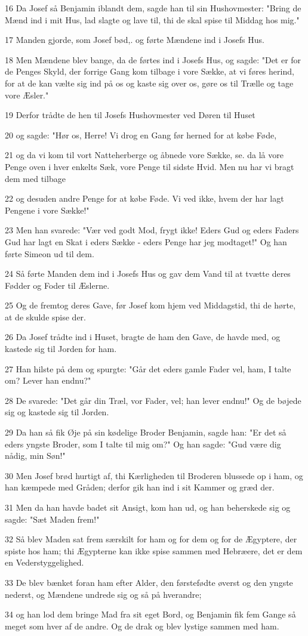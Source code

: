 \par 16 Da Josef så Benjamin iblandt dem, sagde han til sin Hushovmester: "Bring de Mænd ind i mit Hus, lad slagte og lave til, thi de skal spise til Middag hos mig."
\par 17 Manden gjorde, som Josef bød,. og førte Mændene ind i Josefs Hus.
\par 18 Men Mændene blev bange, da de førtes ind i Josefs Hus, og sagde: "Det er for de Penges Skyld, der forrige Gang kom tilbage i vore Sække, at vi føres herind, for at de kan vælte sig ind på os og kaste sig over os, gøre os til Trælle og tage vore Æsler."
\par 19 Derfor trådte de hen til Josefs Hushovmester ved Døren til Huset
\par 20 og sagde: "Hør os, Herre! Vi drog en Gang før herned for at købe Føde,
\par 21 og da vi kom til vort Natteherberge og åbnede vore Sække, se. da lå vore Penge oven i hver enkelts Sæk, vore Penge til sidste Hvid. Men nu har vi bragt dem med tilbage
\par 22 og desuden andre Penge for at købe Føde. Vi ved ikke, hvem der har lagt Pengene i vore Sække!"
\par 23 Men han svarede: "Vær ved godt Mod, frygt ikke! Eders Gud og eders Faders Gud har lagt en Skat i eders Sække - eders Penge har jeg modtaget!" Og han førte Simeon ud til dem.
\par 24 Så førte Manden dem ind i Josefs Hus og gav dem Vand til at tvætte deres Fødder og Foder til Æslerne.
\par 25 Og de fremtog deres Gave, før Josef kom hjem ved Middagstid, thi de hørte, at de skulde spise der.
\par 26 Da Josef trådte ind i Huset, bragte de ham den Gave, de havde med, og kastede sig til Jorden for ham.
\par 27 Han hilste på dem og spurgte: "Går det eders gamle Fader vel, ham, I talte om? Lever han endnu?"
\par 28 De svarede: "Det går din Træl, vor Fader, vel; han lever endnu!" Og de bøjede sig og kastede sig til Jorden.
\par 29 Da han så fik Øje på sin kødelige Broder Benjamin, sagde han: "Er det så eders yngste Broder, som I talte til mig om?" Og han sagde: "Gud være dig nådig, min Søn!"
\par 30 Men Josef brød hurtigt af, thi Kærligheden til Broderen blussede op i ham, og han kæmpede med Gråden; derfor gik han ind i sit Kammer og græd der.
\par 31 Men da han havde badet sit Ansigt, kom han ud, og han beherskede sig og sagde: "Sæt Maden frem!"
\par 32 Så blev Maden sat frem særskilt for ham og for dem og for de Ægyptere, der spiste hos ham; thi Ægypterne kan ikke spise sammen med Hebræere, det er dem en Vederstyggelighed.
\par 33 De blev bænket foran ham efter Alder, den førstefødte øverst og den yngste nederst, og Mændene undrede sig og så på hverandre;
\par 34 og han lod dem bringe Mad fra sit eget Bord, og Benjamin fik fem Gange så meget som hver af de andre. Og de drak og blev lystige sammen med ham.

